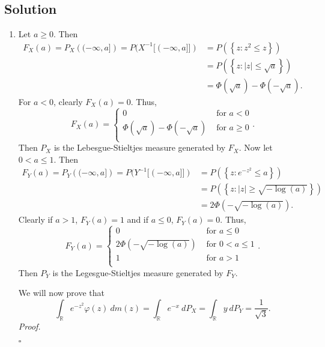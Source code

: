 \documentclass[12pt]{article}
\newcounter{ProofCounter}
\newenvironment{Proof}{\stepcounter{ProofCounter}\textit{Proof.}}{\hfill$\square$}
\begin{document}
\subsection*{Solution}
\begin{enumerate}[label=(\alph*)]
\item 
Let $a \geq 0$. Then 
\begin{align*}
F_{X}(a) = P_{X}\left( (-\infty, a] \right) = P(X^{-1}[(-\infty, a]]) & = P\left( \left\{ z : z^{2} \leq z \right\} \right) \\
& = P\left( \left\{ z : |z| \leq \sqrt{a} \right\} \right) \\
& = \Phi(\sqrt{a}) - \Phi(-\sqrt{a}). 
\end{align*}
For $a < 0$, clearly $F_{X}(a) = 0$. Thus,
\[ F_{X}(a) = \left\{ \begin{array}{cl}
0 & \text{ for } a < 0 \\
\Phi(\sqrt{a}) - \Phi(-\sqrt{a}) & \text{ for } a \geq 0 \\
\end{array} \right.. \]
Then $P_{X}$ is the Lebesgue-Stieltjes measure generated by $F_{X}$. Now let $0 < a \leq 1$. Then 
\begin{align*}
F_{Y}(a) = P_{Y}\left( (-\infty, a] \right) = P(Y^{-1}[(-\infty, a]]) & = P\left( \left\{ z : e^{-z^{2}} \leq a \right\} \right) \\
& = P\left( \left\{ z : |z| \geq \sqrt{-\log(a)} \right\} \right) \\
& = 2\Phi(-\sqrt{-\log(a)}).
\end{align*}
Clearly if $a > 1$, $F_{Y}(a) = 1$ and if $a \leq 0$, $F_{Y}(a) = 0$. Thus,
\[ F_{Y}(a) = \left\{ \begin{array}{cl}
0 & \text{ for } a \leq 0 \\
2\Phi(-\sqrt{-\log(a)}) & \text{ for } 0 < a \leq 1 \\
1 & \text{ for } a > 1 \\
\end{array} \right. . \]
Then $P_{Y}$ is the Legesgue-Stieltjes measure generated by $F_{Y}$.

We will now prove that 
\[ \int_{\mathbb{R}}e^{-z^{2}}\varphi(z)\ dm(z) = \int_{\mathbb{R}}e^{-x}\ dP_{X} = \int_{\mathbb{R}}y\ dP_{Y} = \frac{1}{\sqrt{3}}. \]
\begin{Proof}


\end{Proof}
\end{enumerate}
\end{document}

